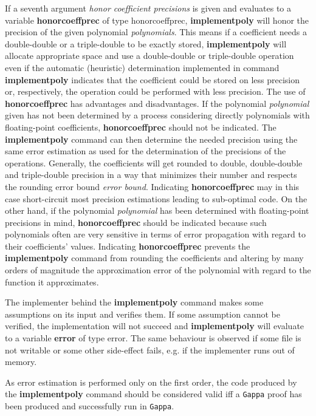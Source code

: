 \begin{itemize}
   If a seventh argument \emph{honor coefficient precisions} is given and
   evaluates to a variable \textbf{honorcoeffprec} of type \textsf{honorcoeffprec},
   \textbf{implementpoly} will honor the precision of the given polynomial
   \emph{polynomials}. This means if a coefficient needs a double-double or a
   triple-double to be exactly stored, \textbf{implementpoly} will allocate appropriate
   space and use a double-double or triple-double operation even if the
   automatic (heuristic) determination implemented in command \textbf{implementpoly}
   indicates that the coefficient could be stored on less precision or,
   respectively, the operation could be performed with less
   precision. The use of \textbf{honorcoeffprec} has advantages and
   disadvantages. If the polynomial \emph{polynomial} given has not been
   determined by a process considering directly polynomials with
   floating-point coefficients, \textbf{honorcoeffprec} should not be
   indicated. The \textbf{implementpoly} command can then determine the needed
   precision using the same error estimation as used for the
   determination of the precisions of the operations. Generally, the
   coefficients will get rounded to double, double-double and
   triple-double precision in a way that minimizes their number and
   respects the rounding error bound \emph{error bound}.  Indicating
   \textbf{honorcoeffprec} may in this case short-circuit most precision
   estimations leading to sub-optimal code. On the other hand, if the
   polynomial \emph{polynomial} has been determined with floating-point
   precisions in mind, \textbf{honorcoeffprec} should be indicated because such
   polynomials often are very sensitive in terms of error propagation with
   regard to their coefficients' values. Indicating \textbf{honorcoeffprec}
   prevents the \textbf{implementpoly} command from rounding the coefficients and
   altering by many orders of magnitude the approximation error of the
   polynomial with regard to the function it approximates.
    
   The implementer behind the \textbf{implementpoly} command makes some assumptions on
   its input and verifies them. If some assumption cannot be verified,
   the implementation will not succeed and \textbf{implementpoly} will evaluate to a
   variable \textbf{error} of type \textsf{error}. The same behaviour is observed if
   some file is not writable or some other side-effect fails, e.g. if
   the implementer runs out of memory.
    
   As error estimation is performed only on the first order, the code
   produced by the \textbf{implementpoly} command should be considered valid iff a
   \texttt{Gappa} proof has been produced and successfully run
   in \texttt{Gappa}.
\end{itemize}
